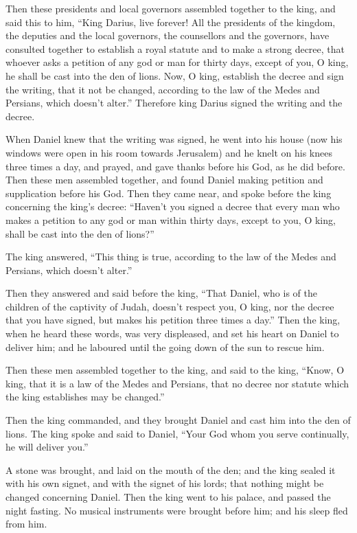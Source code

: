  Then these presidents and local governors assembled
together to the king, and said this to him, ``King Darius, live forever!
 All the presidents of the kingdom, the deputies and the
local governors, the counsellors and the governors, have consulted
together to establish a royal statute and to make a strong decree, that
whoever asks a petition of any god or man for thirty days, except of
you, O king, he shall be cast into the den of lions.  Now, O
king, establish the decree and sign the writing, that it not be changed,
according to the law of the Medes and Persians, which doesn't alter.''
 Therefore king Darius signed the writing and the decree.

 When Daniel knew that the writing was signed, he went into
his house (now his windows were open in his room towards Jerusalem) and
he knelt on his knees three times a day, and prayed, and gave thanks
before his God, as he did before.  Then these men assembled
together, and found Daniel making petition and supplication before his
God.  Then they came near, and spoke before the king
concerning the king's decree: ``Haven't you signed a decree that every
man who makes a petition to any god or man within thirty days, except to
you, O king, shall be cast into the den of lions?''

The king answered, ``This thing is true, according to the law of the
Medes and Persians, which doesn't alter.''

 Then they answered and said before the king, ``That
Daniel, who is of the children of the captivity of Judah, doesn't
respect you, O king, nor the decree that you have signed, but makes his
petition three times a day.''  Then the king, when he heard
these words, was very displeased, and set his heart on Daniel to deliver
him; and he laboured until the going down of the sun to rescue him.

 Then these men assembled together to the king, and said to
the king, ``Know, O king, that it is a law of the Medes and Persians,
that no decree nor statute which the king establishes may be changed.''

 Then the king commanded, and they brought Daniel and cast
him into the den of lions. The king spoke and said to Daniel, ``Your God
whom you serve continually, he will deliver you.''

 A stone was brought, and laid on the mouth of the den; and
the king sealed it with his own signet, and with the signet of his
lords; that nothing might be changed concerning Daniel. 
Then the king went to his palace, and passed the night fasting. No
musical instruments were brought before him; and his sleep fled from
him.

